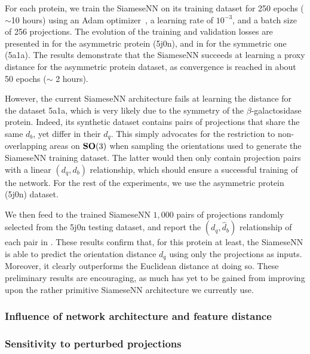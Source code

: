 For each protein, we train the SiameseNN on its training dataset for 250 epochs ($\sim$10 hours) using an Adam optimizer~\cite{kingma2014adam}, a learning rate of $10^{-3}$, and a batch size of 256 projections.
The evolution of the training and validation losses are presented in  for the asymmetric protein (5j0n), and in  for the symmetric one (5a1a).
The results demonstrate that the SiameseNN succeeds at learning a proxy distance for the asymmetric protein dataset, as convergence is reached in about 50 epochs ($\sim$ 2 hours).

However, the current SiameseNN architecture fails at learning the distance for the dataset 5a1a, which is very likely due to the symmetry of the $\beta$-galactosidase protein.
Indeed, its synthetic dataset contains pairs of projections that share the same $d_b$, yet differ in their $d_q$.
This simply advocates for the restriction to non-overlapping areas on $\mathrm{\mathbf{SO}}(3)$ when sampling the orientations used to generate the SiameseNN training dataset.
The latter would then only contain projection pairs with a linear $(d_q,d_b)$ relationship, which should ensure a successful training of the network.
For the rest of the experiments, we use the asymmetric protein (5j0n) dataset.

We then feed to the trained SiameseNN $1,000$ pairs of projections randomly selected from the 5j0n testing dataset, and report the $(d_q,\widehat{d}_b)$ relationship of each pair in .
These results confirm that, for this protein at least, the SiameseNN is able to predict the orientation distance $d_q$ using only the projections as inputs.
Moreover, it clearly outperforms the Euclidean distance at doing so.
These preliminary results are encouraging, as much has yet to be gained from improving upon the rather primitive SiameseNN architecture we currently use.

\subsubsection{Influence of network architecture and feature distance}


\subsubsection{Sensitivity to perturbed projections}\label{sec:results:distance-estimation:sensitivity}

